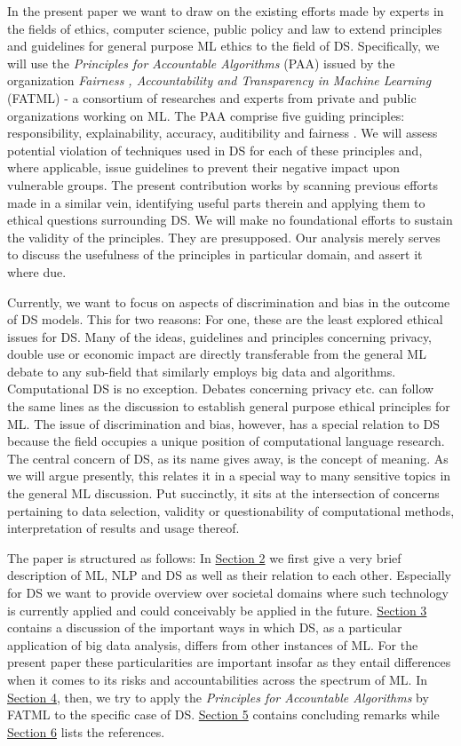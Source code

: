 \documentclass{article}
\begin{document}
In the present paper we want to draw on the existing efforts made by experts in the fields of ethics, computer science, public policy and law to extend principles  and guidelines for general purpose ML ethics to the field of DS. Specifically, we will use the \emph{Principles for Accountable Algorithms} (PAA) issued by the organization \emph{Fairness , Accountability and Transparency in Machine Learning} (FATML) - a consortium of researches and experts from private and public organizations working on ML. 
The PAA comprise five guiding principles: responsibility, explainability, accuracy, auditibility and fairness \cite{principles}.
We will assess potential violation of techniques used in DS for each of these principles and, where applicable, issue guidelines to prevent their negative impact upon vulnerable groups. 
The present contribution works by scanning previous efforts made in a similar vein, identifying useful parts therein and applying them to ethical questions surrounding DS. We will make no foundational efforts to sustain the validity of the principles. They are presupposed. Our analysis merely serves to discuss the usefulness of the principles in particular domain, and assert it where due.

Currently, we want to focus on aspects of discrimination and bias in the outcome of DS models. This for two reasons: For one, these are the least explored ethical issues for DS. Many of the ideas, guidelines and principles concerning privacy, double use or economic impact are directly transferable from the general ML debate to any sub-field that similarly employs big data and algorithms. Computational DS is no exception. Debates concerning privacy etc. can follow the same lines as the discussion to establish general purpose ethical principles for ML. The issue of discrimination and bias, however, has a special relation to DS because the field occupies a unique position of computational language research. The central concern of DS, as its name gives away, is the concept of meaning. As we will argue presently, this relates it in a special way to many sensitive topics in the general ML discussion. Put succinctly, it sits at the intersection of concerns pertaining to data selection, validity or questionability of computational methods, interpretation of results and usage thereof.

The paper is structured as follows: In \hyperlink{sec2}{Section 2} we first give a very brief description of ML, NLP and DS as well as their relation to each other. Especially for DS we want to provide overview over societal domains where such technology is currently applied and could conceivably be applied in the future. \hyperlink{sec3}{Section 3} contains a discussion of the important ways in which DS, as a particular application of big data analysis, differs from other instances of ML. For the present paper these particularities are important insofar as they entail differences when it comes to its risks and accountabilities across the spectrum of ML. In \hyperlink{sec4}{Section 4}, then, we try to apply the \emph{Principles for Accountable Algorithms} by FATML to the specific case of DS. \hyperlink{sec5}{Section 5} contains concluding remarks while \hyperlink{sec6}{Section 6} lists the references.
\end{document}
